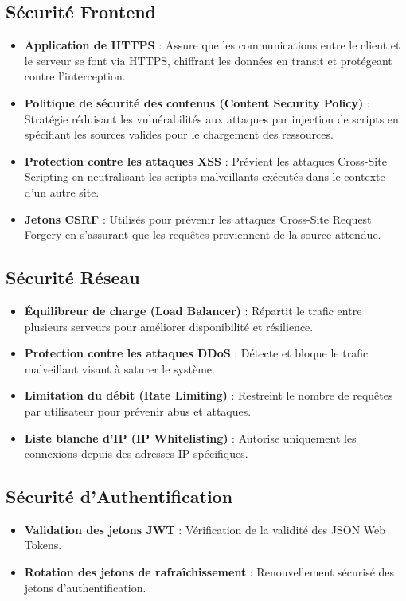 \documentclass[12pt]{rapportPfe}
\begin{document}
\subsection*{Sécurité Frontend}
\begin{itemize}
  \item \textbf{Application de HTTPS} : Assure que les communications entre le client et le serveur se font via HTTPS, chiffrant les données en transit et protégeant contre l'interception.
  \item \textbf{Politique de sécurité des contenus (Content Security Policy)} : Stratégie réduisant les vulnérabilités aux attaques par injection de scripts en spécifiant les sources valides pour le chargement des ressources.
  \item \textbf{Protection contre les attaques XSS} : Prévient les attaques Cross-Site Scripting en neutralisant les scripts malveillants exécutés dans le contexte d'un autre site.
  \item \textbf{Jetons CSRF} : Utilisés pour prévenir les attaques Cross-Site Request Forgery en s'assurant que les requêtes proviennent de la source attendue.
\end{itemize}

\subsection*{Sécurité Réseau}
\begin{itemize}
  \item \textbf{Équilibreur de charge (Load Balancer)} : Répartit le trafic entre plusieurs serveurs pour améliorer disponibilité et résilience.
  \item \textbf{Protection contre les attaques DDoS} : Détecte et bloque le trafic malveillant visant à saturer le système.
  \item \textbf{Limitation du débit (Rate Limiting)} : Restreint le nombre de requêtes par utilisateur pour prévenir abus et attaques.
  \item \textbf{Liste blanche d'IP (IP Whitelisting)} : Autorise uniquement les connexions depuis des adresses IP spécifiques.
\end{itemize}

\subsection*{Sécurité d'Authentification}
\begin{itemize}
  \item \textbf{Validation des jetons JWT} : Vérification de la validité des JSON Web Tokens.
  \item \textbf{Rotation des jetons de rafraîchissement} : Renouvellement sécurisé des jetons d'authentification.
\end{itemize}
\end{document}
